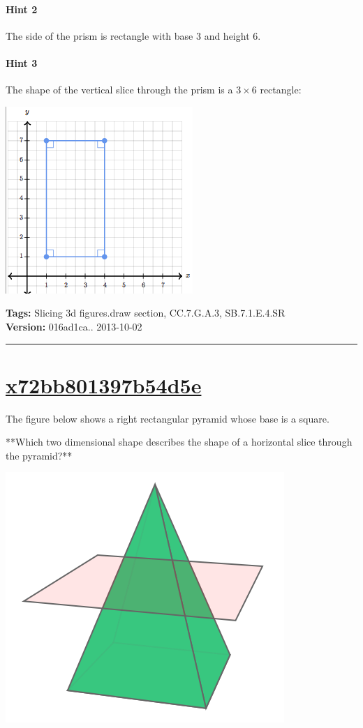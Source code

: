 \documentclass[twocolumn,10pt]{article}
\def\shrinkfactor{0.55}
\begin{document}
\paragraph{Hint 2}The side of the prism is rectangle with base $3$ and height $6$.

\paragraph{Hint 3}The shape of the vertical slice through the prism is a $3 \times 6$ rectangle:   

\includegraphics[scale=\shrinkfactor]{figures/afdbf1f1510de1b384cf8ec99b6646737b06944a.png}



\medskip
\noindent
\textbf{Tags:} {\footnotesize Slicing 3d figures.draw section, CC.7.G.A.3, SB.7.1.E.4.SR}\\
\textbf{Version:} 016ad1ca.. 2013-10-02
\smallskip\hrule





\section{\href{https://www.khanacademy.org/devadmin/content/items/x72bb801397b54d5e}{x72bb801397b54d5e}}

\noindent
The figure below shows a right rectangular pyramid whose base is a square.

**Which two dimensional shape describes the shape of a horizontal slice through the pyramid?**  


\includegraphics[scale=\shrinkfactor]{figures/3f0ba787b169725c8c4c74a3017b4210d7a511f5.png}
\end{document}
